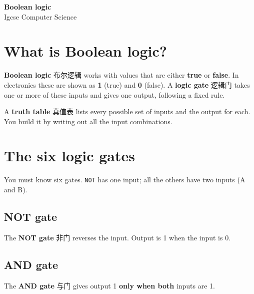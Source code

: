 \documentclass[11pt]{article}
\begin{document}
\begin{center}
  {\LARGE\bfseries Boolean logic}\\[0.35em]
  {\large Igcse Computer Science}
\end{center}
\vspace{0.6em}

\section*{What is Boolean logic?}

\textbf{Boolean logic} 布尔逻辑 works with values that are either \textbf{true} or \textbf{false}. In electronics these are shown as \textbf{1} (true) and \textbf{0} (false). A \textbf{logic gate} 逻辑门 takes one or more of these inputs and gives one output, following a fixed rule.

A \textbf{truth table} 真值表 lists every possible set of inputs and the output for each. You build it by writing out all the input combinations.

\section*{The six logic gates}

You must know six gates. \texttt{NOT} has one input; all the others have two inputs (A and B).

\subsection*{NOT gate}

The \textbf{NOT gate} 非门 reverses the input. Output is 1 when the input is 0.

\begin{center}
\end{center}

\subsection*{AND gate}

The \textbf{AND gate} 与门 gives output 1 \textbf{only when both} inputs are 1.
\end{document}
